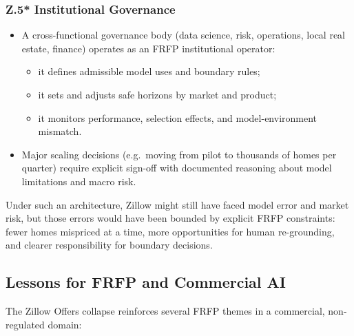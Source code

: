 \subsubsection*{Z.5* Institutional Governance}

\begin{itemize}
  \item A cross-functional governance body (data science, risk, operations,
        local real estate, finance) operates as an FRFP institutional operator:
        \begin{itemize}
          \item it defines admissible model uses and boundary rules;
          \item it sets and adjusts safe horizons by market and product;
          \item it monitors performance, selection effects, and
                model-environment mismatch.
        \end{itemize}
  \item Major scaling decisions (e.g.\ moving from pilot to thousands of
        homes per quarter) require explicit sign-off with documented
        reasoning about model limitations and macro risk.
\end{itemize}

Under such an architecture, Zillow might still have faced model error and
market risk, but those errors would have been bounded by explicit FRFP
constraints:
fewer homes mispriced at a time, more opportunities for human re-grounding,
and clearer responsibility for boundary decisions.

\subsection{Lessons for FRFP and Commercial AI}

The Zillow Offers collapse reinforces several FRFP themes in a commercial,
non-regulated domain:

